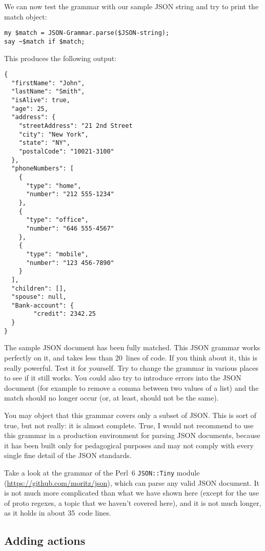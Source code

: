 We can now test the grammar with our sample JSON string 
and try to print the match object:

\begin{verbatim}
my $match = JSON-Grammar.parse($JSON-string);
say ~$match if $match;
\end{verbatim}

This produces the following output:

\begin{verbatim}
{
  "firstName": "John",
  "lastName": "Smith",
  "isAlive": true,
  "age": 25,
  "address": {
    "streetAddress": "21 2nd Street
    "city": "New York",
    "state": "NY",
    "postalCode": "10021-3100"
  },
  "phoneNumbers": [
    {
      "type": "home",
      "number": "212 555-1234"
    },
    {
      "type": "office",
      "number": "646 555-4567"
    },
    {
      "type": "mobile",
      "number": "123 456-7890"
    }
  ],
  "children": [],
  "spouse": null,
  "Bank-account": {
        "credit": 2342.25
  }
}
\end{verbatim}

The sample JSON document has been fully matched. This 
JSON grammar works perfectly on it, and takes less than 
20~lines of code. If you think about it, this is 
really powerful. Test it for yourself. Try to change 
the grammar in various places to see if it still works. 
You could also try to introduce errors into the JSON 
document (for example to remove a comma between two values 
of a list) and the match should no longer occur (or, at least, 
should not be the same).

You may object that this grammar covers only a subset 
of JSON. This is sort of true, but not really: it is almost complete. 
True, I would not recommend to use this grammar 
in a production environment for parsing JSON documents, 
because it has been built only for pedagogical purposes 
and may not comply with every single fine detail of the JSON 
standards.

Take a look at the grammar of the Perl~6 {\tt JSON::Tiny} 
module (\url{https://github.com/moritz/json}), which can 
parse any valid JSON document. It is not much more 
complicated than what we have shown here (except for the use 
of proto regexes, a topic that we haven't covered here), and 
it is not much longer, as it holds in about 35~code lines.

\subsection{Adding actions}

